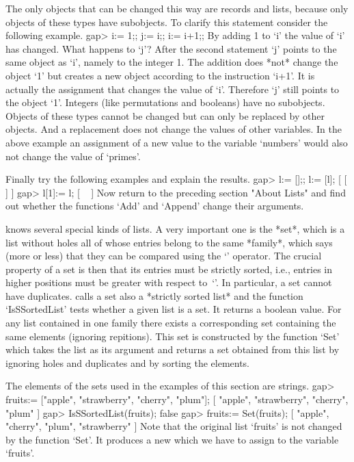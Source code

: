 The  only objects  that can be  changed  this way  are records and lists,
because only {\GAP} objects of  these  types have subobjects.  To clarify
this statement consider the following example.
\beginexample
    gap> i:= 1;; j:= i;; i:= i+1;; 
\endexample
By adding 1 to `i' the value of `i' has  changed.   What  happens to `j'?
After the second statement `j' points to the same object  as `i',  namely
to the  integer 1.  The  addition  does *not* change  the object `1'  but
creates a new object according  to the instruction `i+1'.  It is actually
the assignment that changes the value of `i'.  Therefore `j' still points
to  the object `1'.  Integers  (like permutations and  booleans)  have no
subobjects.  Objects  of these types  cannot  be  changed but can only be
replaced by other objects.   And a replacement does not change the values
of other variables.  In the above example an assignment of a new value to
the variable `numbers' would also not change the value of `primes'.

Finally try the following examples and explain the results.
\beginexample
    gap> l:= [];; l:= [l];
    [ [  ] ]
    gap> l[1]:= l;
    [ ~ ]
\endexample
Now return to the  preceding section  "About Lists" and  find out whether
the functions `Add' and `Append' change their arguments.


{\GAP} knows several special kinds of lists.  A very important one is the
*set*, which is a  list without holes all of  whose entries belong to the
same *family*,
%
which says (more  or less)  that they   can be  compared using  the  `\<'
operator. The crucial property of a set is then that  its entries must be
strictly sorted, i.e.,  entries in higher positions  must be greater with
respect  to~`\<'. In  particular,  a set  cannot have duplicates.  {\GAP}
calls a set also a *strictly sorted list*
%
and the function `IsSSortedList' tests whether a given  list is a set. It
returns  a boolean value.  For  any list  contained  in one family  there
exists a  corresponding   set containing  the  same   elements  (ignoring
repitions). This set is constructed by the function `Set' which takes the
list as   its argument and   returns a set  obtained  from this   list by
ignoring holes and duplicates and by sorting the elements.

The  elements  of  the  sets used  in  the  examples of this  section are
strings.
\beginexample
    gap> fruits:= ["apple", "strawberry", "cherry", "plum"];
    [ "apple", "strawberry", "cherry", "plum" ]
    gap> IsSSortedList(fruits);
    false
    gap> fruits:= Set(fruits);
    [ "apple", "cherry", "plum", "strawberry" ] 
\endexample
Note  that the  original list `fruits'  is not  changed  by the  function
`Set'.  It   produces a new  which  we  have to   assign to  the variable
`fruits'.

